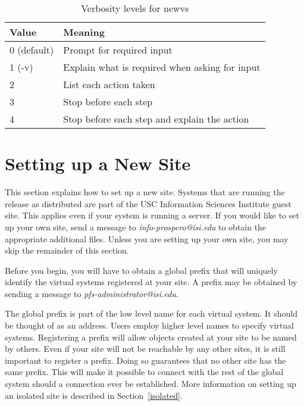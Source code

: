 \begin{table}
\begin{center}
\caption{Verbosity levels for newvs\label{newvs_verbosity_tab}}
\vspace{0.1in}
\begin{tabular}{|l|l|}\hline
Value & Meaning \\ \hline \hline
0 (default) & Prompt for required input \\ \hline
1 (-v) & Explain what is required when asking for input \\ \hline
2 & List each action taken \\ \hline
3 & Stop before each step \\ \hline
4 & Stop before each step and explain the action \\ \hline
\end{tabular}
\vspace{-0.1in}
\end{center}
\end{table}

\section{Setting up a New Site\label{new_site}}

This section explains how to set up a new site.  Systems that are
running the release as distributed are part of the USC Information
Sciences Institute guest site.  This applies even if your system is running a
server.  If you would like to set up your own site, send a message to
{\it info-prospero@isi.edu} to obtain the appropriate
additional files.  Unless you are setting up
your own site, you may skip the remainder of this section.

Before you begin, you will have to obtain a global prefix that will
uniquely identify the virtual systems registered at your site.  A
prefix may be obtained by sending a message to {\it
pfs-administrator@isi.edu}.

The global prefix is part of the low level name for each virtual
system.  It should be thought of as an address.  Users employ higher
level names to specify virtual systems.  Registering a prefix will
allow objects created at your site to be named by others.  Even if
your site will not be reachable by any other sites, it is still
important to register a prefix.  Doing so guarantees that no other
site has the same prefix.  This will make it possible to connect with
the rest of the global system should a connection ever be established.
More information on setting up an isolated site is described in
Section~\ref{isolated}.

